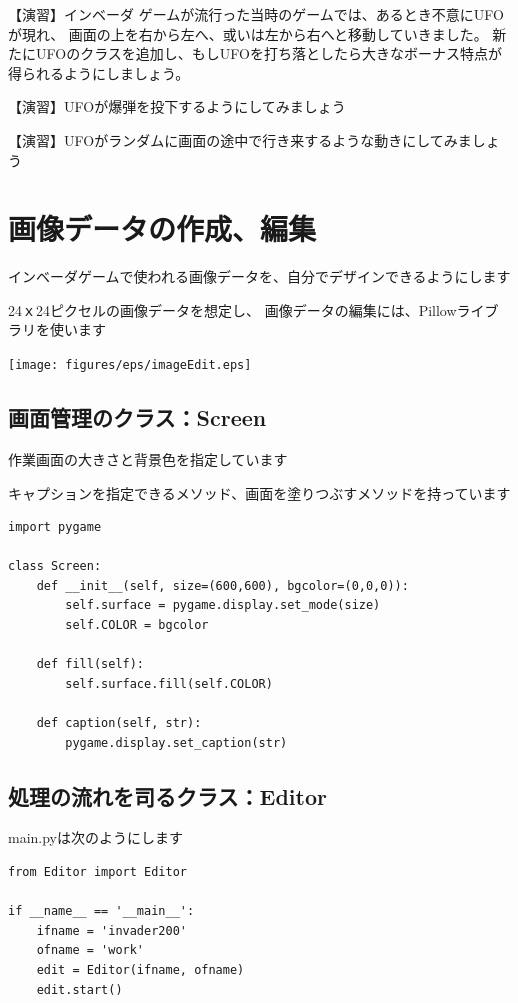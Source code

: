 \documentclass[uplatex,a4paper,11pt,oneside,openany]{jsbook}
\begin{document}
【演習】インベーダ ゲームが流行った当時のゲームでは、あるとき不意にUFOが現れ、
画面の上を右から左へ、或いは左から右へと移動していきました。
新たにUFOのクラスを追加し、もしUFOを打ち落としたら大きなボーナス特点が
得られるようにしましょう。

【演習】UFOが爆弾を投下するようにしてみましょう

【演習】UFOがランダムに画面の途中で行き来するような動きにしてみましょう

\newpage

\section{画像データの作成、編集}

インベーダゲームで使われる画像データを、自分でデザインできるようにします

24ｘ24ピクセルの画像データを想定し、
画像データの編集には、Pillowライブラリを使います

\begin{center}
  \texttt{[image: figures/eps/imageEdit.eps]}
\end{center}

\subsection{画面管理のクラス：Screen}

作業画面の大きさと背景色を指定しています

キャプションを指定できるメソッド、画面を塗りつぶすメソッドを持っています

\begin{lstlisting}[caption=class Screen,label=pr03]
import pygame

class Screen:
    def __init__(self, size=(600,600), bgcolor=(0,0,0)):
        self.surface = pygame.display.set_mode(size)
        self.COLOR = bgcolor

    def fill(self):
        self.surface.fill(self.COLOR)

    def caption(self, str):
        pygame.display.set_caption(str)
\end{lstlisting}

\subsection{処理の流れを司るクラス：Editor}

main.pyは次のようにします

\begin{lstlisting}[caption=main.py,label=pr01]
from Editor import Editor

if __name__ == '__main__':
    ifname = 'invader200'
    ofname = 'work'
    edit = Editor(ifname, ofname)
    edit.start()
\end{lstlisting}
\end{document}
